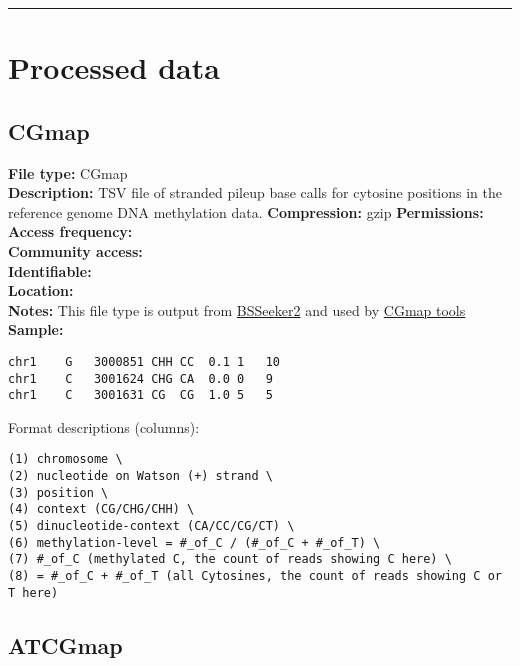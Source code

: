\documentclass[
]{book}
\begin{document}
\begin{center}\rule{0.5\linewidth}{0.5pt}\end{center}

\hypertarget{processed-data}{%
\section{Processed data}\label{processed-data}}

\hypertarget{cgmap}{%
\subsection{CGmap}\label{cgmap}}

\textbf{File type:} CGmap\\
\textbf{Description:} TSV file of stranded pileup base calls for cytosine positions in the reference genome DNA methylation data.
\textbf{Compression:} gzip
\textbf{Permissions:}\\
\textbf{Access frequency:}\\
\textbf{Community access:}\\
\textbf{Identifiable:}\\
\textbf{Location:}\\
\textbf{Notes:} This file type is output from \href{https://github.com/BSSeeker/BSseeker2}{BSSeeker2} and used by \href{https://cgmaptools.github.io/}{CGmap tools}\\
\textbf{Sample:}

\begin{verbatim}
chr1    G   3000851 CHH CC  0.1 1   10
chr1    C   3001624 CHG CA  0.0 0   9
chr1    C   3001631 CG  CG  1.0 5   5
\end{verbatim}

Format descriptions (columns):

\begin{verbatim}
(1) chromosome \
(2) nucleotide on Watson (+) strand \
(3) position \
(4) context (CG/CHG/CHH) \
(5) dinucleotide-context (CA/CC/CG/CT) \
(6) methylation-level = #_of_C / (#_of_C + #_of_T) \
(7) #_of_C (methylated C, the count of reads showing C here) \
(8) = #_of_C + #_of_T (all Cytosines, the count of reads showing C or T here)
\end{verbatim}

\hypertarget{atcgmap}{%
\subsection{ATCGmap}\label{atcgmap}}
\end{document}
